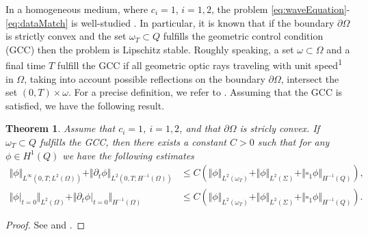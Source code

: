 \documentclass[sn-mathphys-num]{sn-jnl}
\newtheorem{thm}{Theorem}[section]
\numberwithin{equation}{section}
\newcommand{\dt}{\partial_t}
\begin{document}
\noindent In a homogeneous medium, where $c_i = 1$, $i = 1,2$, the problem \eqref{eq:waveEquation}-\eqref{eq:dataMatch} is well-studied \cite{BFO20,BFMO21,DMS23}. In particular, it is known that if the boundary $\partial \Omega$ is strictly convex and the set $\omega_T \subset Q$ fulfills the geometric control condition (GCC) \cite{BLR88,BLR92} then the problem is Lipschitz stable. Roughly speaking, a set $\omega \subset \Omega$ and a final time $T$ fulfill the GCC if all geometric optic rays traveling with unit speed\textsuperscript{1}\footnotemark {} in $\Omega$, taking into account possible reflections on the boundary $\partial \Omega$, intersect the set $(0,T) \times \omega$. For a precise definition, we refer to \cite{BLR88,BLR92}. Assuming that the GCC is satisfied, we have the following result.

\begin{thm}\label{thm:Lipschitz}
    Assume that $c_i = 1$, $i = 1,2$, and that $\partial \Omega$ is stricly convex. If $\omega_T \subset Q$ fulfills the GCC, then there exists a constant $C > 0$ such that for any $\phi \in H^1(Q)$ we have the following estimates
    \begin{align*}
        \Vert \phi \Vert_{L^\infty(0,T;L^2(\Omega))} + \Vert \dt \phi \Vert_{L^2(0,T;H^{-1}(\Omega))} &\le C \left(  \Vert \phi \Vert_{L^2(\omega_T)} + \Vert \phi \Vert_{L^2(\Sigma)} + \Vert \square_1 \phi \Vert_{H^{-1}(Q)} \right), \\
        \Vert \phi \vert_{t = 0} \Vert_{L^2(\Omega)} + \Vert \dt \phi \vert_{t = 0} \Vert_{H^{-1}(\Omega)} &\le C \left(\Vert \phi \Vert_{L^2(\omega_T)} + \Vert \phi \Vert_{L^2(\Sigma)} + \Vert \square_1 \phi \Vert_{H^{-1}(Q)} \right). 
    \end{align*}
\end{thm}

\begin{proof}
    See \cite[Thm. A.4]{BFMO21control} and \cite[Rem. A.5]{BFMO21control}.
\end{proof}
\end{document}
